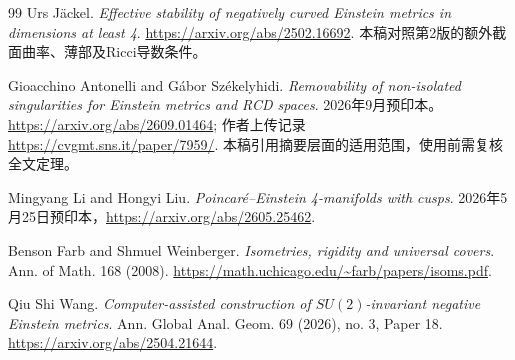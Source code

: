 \documentclass[UTF8,fontset=fandol,zihao=-4]{ctexart}
\theoremstyle{cn}
\begin{document}
\begin{thebibliography}{99}
 Urs Jäckel. \emph{Effective stability of negatively curved Einstein metrics in dimensions at least 4}. \url{https://arxiv.org/abs/2502.16692}. 本稿对照第2版的额外截面曲率、薄部及Ricci导数条件。

 Gioacchino Antonelli and Gábor Székelyhidi. \emph{Removability of non-isolated singularities for Einstein metrics and RCD spaces}. 2026年9月预印本。\url{https://arxiv.org/abs/2609.01464}; 作者上传记录\url{https://cvgmt.sns.it/paper/7959/}. 本稿引用摘要层面的适用范围，使用前需复核全文定理。

 Mingyang Li and Hongyi Liu. \emph{Poincaré--Einstein 4-manifolds with cusps}. 2026年5月25日预印本，\url{https://arxiv.org/abs/2605.25462}.

 Benson Farb and Shmuel Weinberger. \emph{Isometries, rigidity and universal covers}. Ann. of Math. 168 (2008). \url{https://math.uchicago.edu/~farb/papers/isoms.pdf}.

 Qiu Shi Wang. \emph{Computer-assisted construction of $SU(2)$-invariant negative Einstein metrics}. Ann. Global Anal. Geom. 69 (2026), no. 3, Paper 18. \url{https://arxiv.org/abs/2504.21644}.

\end{thebibliography}
\end{document}
